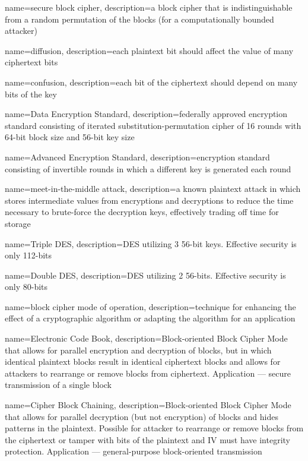 {
    name={secure block cipher},
    description={a block cipher that is indistinguishable from a random permutation of the blocks (for a computationally bounded attacker)}
}

{
    name={diffusion},
    description={each plaintext bit should affect the value of many ciphertext bits}
}

{
    name={confusion},
    description={each bit of the ciphertext should depend on many bits of the key}
}

{
    name={Data Encryption Standard},
    description={federally approved encryption standard consisting of iterated substitution-permutation cipher of 16 rounds with 64-bit block size and 56-bit key size}
}

{
    name={Advanced Encryption Standard},
    description={encryption standard consisting of invertible rounds in which a different key is generated each round}
}

{
    name={meet-in-the-middle attack},
    description={a \gls{known plaintext attack} in which stores intermediate values from encryptions and decryptions to reduce the time necessary to brute-force the decryption keys, effectively trading off time for storage}
}

{
    name={Triple DES},
    description={DES utilizing 3 56-bit keys. Effective security is only 112-bits}
}


{
    name={Double DES},
    description={DES utilizing 2 56-bits. Effective security is only 80-bits}
}

{
    name={block cipher mode of operation},
    description={technique for enhancing the effect of a cryptographic algorithm or adapting the algorithm for an application}
}

{
    name={Electronic Code Book},
    description={Block-oriented Block Cipher Mode that allows for parallel encryption and decryption of blocks, but in which identical plaintext blocks result in identical ciphertext blocks and allows for attackers to rearrange or remove blocks from ciphertext. Application --- secure transmission of a single block}
}

{
    name={Cipher Block Chaining},
    description={Block-oriented Block Cipher Mode that allows for parallel decryption (but not encryption) of blocks and hides patterns in the plaintext. Possible for attacker to rearrange or remove blocks from the ciphertext or tamper with bits of the plaintext and IV must have integrity protection. Application --- general-purpose block-oriented transmission}
}

